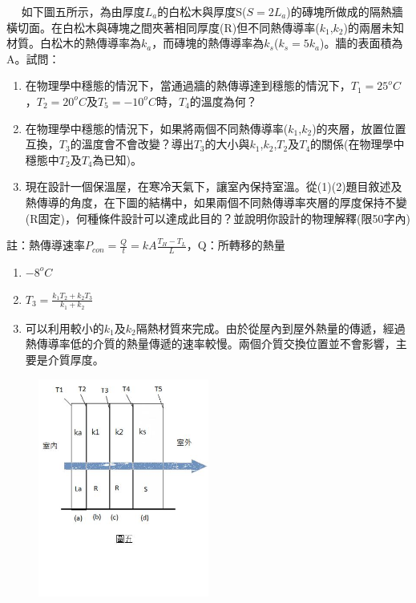\documentclass[cn,10pt,math=newtx,chinesefont=founder]{elegantbook}
\begin{document}
\newpage


\begin{example}　
    如下圖五所示，為由厚度$L_a$的白松木與厚度S($S=2L_a$)的磚塊所做成的隔熱牆橫切面。在白松木與磚塊之間夾著相同厚度(R)但不同熱傳導率($k_1$,$k_2$)的兩層未知材質。白松木的熱傳導率為$k_a$，而磚塊的熱傳導率為$k_s$($k_s=5k_a$)。牆的表面積為A。試問：
    \begin{enumerate}[label=(\arabic*)]
    \item 在物理學中穩態的情況下，當通過牆的熱傳導達到穩態的情況下，$T_1=25^oC$，$T_2=20^oC$及$T_5=-10^oC$時，$T_4$的溫度為何？
    \item 在物理學中穩態的情況下，如果將兩個不同熱傳導率($k_1$,$k_2$)的夾層，放置位置互換，$T_3$的溫度會不會改變？導出$T_3$的大小與$k_1$,$k_2$,$T_2$及$T_4$的關係(在物理學中穩態中$T_2$及$T_4$為已知)。\item 現在設計一個保溫屋，在寒冷天氣下，讓室內保持室溫。從(1)(2)題目敘述及熱傳導的角度，在下圖的結構中，如果兩個不同熱傳導率夾層的厚度保持不變 (R固定)，何種條件設計可以達成此目的？並說明你設計的物理解釋(限50字內)
    \end{enumerate}
    
    註：熱傳導速率$P_{con}=\frac{Q}{t}=kA\frac{T_H-T_L}{L}$，Q：所轉移的熱量
    
    \rightline{[5]}
\end{example}

\begin{solution}
\begin{enumerate}[label=(\arabic*)]
\item $-8^oC$
\item $T_3=\frac{k_1T_2+k_2T_3}{k_1+k_2}$
\item 可以利用較小的$k_1$及$k_2$隔熱材質來完成。由於從屋內到屋外熱量的傳遞，經過熱傳導率低的介質的熱量傳遞的速率較慢。兩個介質交換位置並不會影響，主要是介質厚度。
\end{enumerate}
\end{solution}

\begin{figure}[htbp]
\flushright
\includegraphics[width=0.5\textwidth]{image/5.JPG}
\end{figure}
\end{document}
